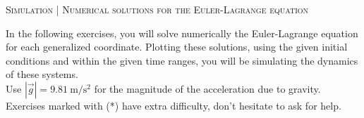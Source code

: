 \documentclass[11pt, a4paper, twoside]{article}
\begin{document}
\begin{center}
  \textsc{\large Simulation | Numerical solutions for the Euler-Lagrange equation}
\end{center}

\noindent
In the following exercises, you will solve numerically the Euler-Lagrange equation for each generalized coordinate. Plotting these solutions, using the given initial conditions and within the given time ranges, you will be simulating the dynamics of these systems.\\
Use \(|\vec{g}| = \SI{9.81}{\metre\per\second\squared}\) for the magnitude of the acceleration due to gravity.\\
Exercises marked with (*) have extra difficulty, don't hesitate to ask for help.
\end{document}
